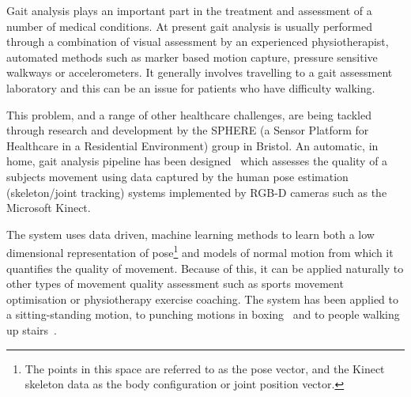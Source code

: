 \documentclass[11pt]{article} %
\begin{document}

Gait analysis plays an important part in the treatment and assessment of a number of medical conditions. At present gait analysis is usually performed through a combination of visual assessment by an experienced physiotherapist, automated methods such as marker based motion capture, pressure sensitive walkways or accelerometers. It generally involves travelling to a gait assessment laboratory and this can be an issue for patients who have difficulty walking. 

This problem, and a range of other healthcare challenges, are being tackled through research and development by the SPHERE (a Sensor Platform for Healthcare in a Residential Environment) group in Bristol. An automatic, in home, gait analysis pipeline has been designed~\cite{Paiement,Tao} which assesses the quality of a subjects movement using data captured by the human pose estimation (skeleton/joint tracking) systems implemented by RGB-D cameras such as the Microsoft Kinect.

The system uses data driven, machine learning methods to learn both a low dimensional representation of pose\footnote{The points in this space are referred to as the pose vector, and the Kinect skeleton data as the body configuration or joint position vector.} and models of normal motion from which it quantifies the quality of movement. Because of this, it can be applied naturally to other types of movement quality assessment such as sports movement optimisation or physiotherapy exercise coaching. The system has been applied to a sitting-standing motion, to punching motions in boxing~\cite{SPHEREweb} and to people walking up stairs~\cite{Paiement,Tao}.
\end{document}
